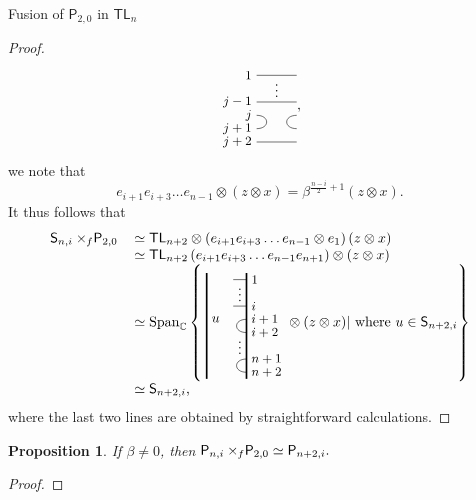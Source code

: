 \documentclass[reqno]{amsart}
\newtheorem{Prop}[Thm]{Proposition}
\newcommand{\tl}[1]{\mathsf{TL}_{#1}}
\newcommand{\ds}[1]{\mathsf S_{#1}}
\newcommand{\dP}[1]{\mathsf P_{#1}}
\newcommand{\xf}{\times\hspace{-0.27em}_f}
\begin{document}
\begin{section}{Fusion of $\dP{2,0}$ in $\tl{n}$}
\begin{proof}
\begin{equation}
\begin{tikzpicture}[baseline={(current bounding box.center)}, scale=1/3]
		\draw (0,2) -- (3,2);
			\node[anchor = east] at (0,2) {\small{$j+2$}};
		\draw (0,3) .. controls (1,3) and (1,4) .. (0,4);
			\node[anchor = east] at (0,3) {\small{$j+1$}};
			\node[anchor = east] at (0,4) {\small{$j$}};
		\draw (3,3) .. controls (2,3) and (2,4) .. (3,4);		
		\draw (0,5) -- (3,5);
			\node[anchor = east] at (0,5) {\small{$j-1$}};
			\node[anchor = south] at (3/2,5) {$\vdots$};
		\draw (0,7) -- (3,7);
			\node[anchor = east] at (0,7) {\small{$1$}};
	\end{tikzpicture},
\end{equation}
we note that $$e_{i+1}e_{i+3}\hdots e_{n-1} \otimes (z \otimes x) = \beta^{\frac{n-i}{2} +1} (z\otimes x).$$ It thus follows that
\begin{equation}
\begin{tabular}{r l}
	$\ds{n,i} \xf \dP{2,0}$&$ \simeq \tl{n+2} \otimes \left(e_{i+1}e_{i+3}\hdots e_{n-1} \otimes e_{1}\right) (z \otimes x)$\\
	& $\simeq \tl{n+2} \left(e_{i+1}e_{i+3}\hdots e_{n-1} e_{n+1}  \right)\otimes (z \otimes x)$\\
	& $\simeq \text{Span}_{\mathbb{C}} \left\{ \;
	\begin{tikzpicture}[baseline={(current bounding box.center)}, scale=1/3]
		\draw[very thick] (0,-1/2) -- (0,15/2);
		\draw[very thick] (3,-1/2) -- (3,15/2);
				\node[anchor = west] at (0,4) {$u$};
			\draw (3,0) .. controls (2,0) and (2,1) .. (3,1);
				\node[anchor=west] at (3,0) {\small{$n+2$}};
				\node[anchor=west] at (3,1) {\small{$n+1$}};
				\node[anchor=south] at (5/2,1) {$\vdots$};
			\draw (3,3) .. controls (2,3) and (2,4) .. (3,4);
				\node[anchor=west] at (3,3) {\small{$i+2$}};
				\node[anchor=west] at (3,4) {\small{$i+1$}};
			\draw (3,5) -- (2,5);
				\node[anchor=west] at (3,5) {\small{$i$}};
				\node[anchor=south] at (5/2,5) {$\vdots$};
			\draw (3,7) -- (2,7);
				\node[anchor=west] at (3,7) {\small{$1$}};
	\end{tikzpicture} \otimes (z \otimes x)| \text{ where } u\in \ds{n+2,i} \right\}$\\
	& $\simeq \ds{n+2,i}$,
\end{tabular}
\end{equation}
where the last two lines are obtained by straightforward calculations.
\end{proof}
\begin{Prop}\label{prop:magickPP2}
If $\beta \neq 0$, then $\dP{n,i} \xf \dP{2,0} \simeq \dP{n+2,i}.$
\end{Prop}
\begin{proof}

\end{proof}
\end{section}
\end{document}
